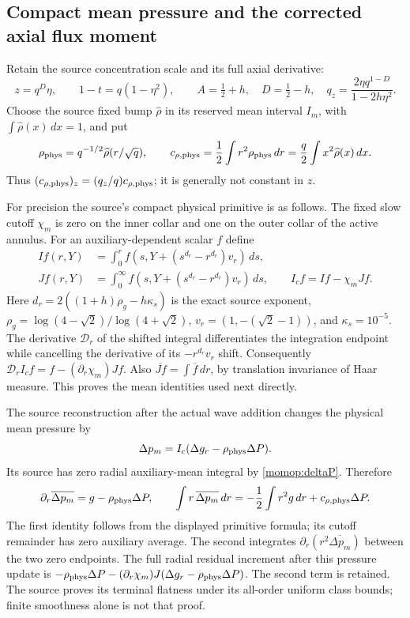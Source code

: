\documentclass[11pt]{article}
\begin{document}
\subsection{Compact mean pressure and the corrected axial flux moment}

Retain the source concentration scale and its full axial derivative:
\[
 z=q^D\eta,\qquad 1-t=q(1-\eta^2),\qquad
 A=\tfrac12+h,\quad D=\tfrac12-h,\quad
 q_z=\frac{2\eta q^{1-D}}{1-2h\eta^2}.
\]
Choose the source fixed bump $\widehat\rho$ in its reserved mean
interval $I_m$, with $\int\widehat\rho(x)\,dx=1$, and put
\[
 \rho_{\rm phys}=q^{-1/2}\widehat\rho(r/\sqrt q),\qquad
 c_{\rho,\rm phys}=\frac12\int r^2\rho_{\rm phys}\,dr
             =\frac q2\int x^2\widehat\rho(x)\,dx .
\]
Thus $(c_{\rho,\rm phys})_z=(q_z/q)c_{\rho,\rm phys}$;
it is generally not constant in $z$.

For precision the source's compact physical primitive is as follows.
The fixed slow cutoff $\chi_m$ is zero on the inner collar and one
on the outer collar of the active annulus. For an auxiliary-dependent
scalar $f$ define
\[
 \begin{split}
 I f(r,Y)&=\int_0^r
 f(s,Y+(s^{d_r}-r^{d_r})v_r)\,ds,\\
 J f(r,Y)&=\int_0^\infty
 f(s,Y+(s^{d_r}-r^{d_r})v_r)\,ds,\qquad
 I_cf=If-\chi_mJf.
 \end{split}
\]
Here $d_r=2((1+h)\rho_g-h\kappa_s)$ is the exact source exponent,
$\rho_g=\log(4-\sqrt2)/\log(4+\sqrt2)$,
$v_r=(1,-(\sqrt2-1))$, and $\kappa_s=10^{-5}$.
The derivative $\mathcal D_r$ of the shifted integral differentiates
the integration endpoint while cancelling the derivative of its
$-r^{d_r}v_r$ shift. Consequently
$\mathcal D_rI_cf=f-(\partial_r\chi_m)Jf$.
Also $\overline{Jf}=\int\overline f\,dr$, by translation invariance
of Haar measure. This proves the mean identities used next directly.

The source reconstruction after the actual wave addition changes the
physical mean pressure by
\[
 \Delta p_m=I_c(\Delta g_r-\rho_{\rm phys}\Delta P).
\]
Its source has zero radial auxiliary-mean integral by
\eqref{momop:deltaP}. Therefore
\begin{equation}\label{momop:pressureidentity}
 \partial_r\overline{\Delta p_m}
     =g-\rho_{\rm phys}\Delta P,\qquad
 \int r\,\overline{\Delta p_m}\,dr
     =-\frac12\int r^2g\,dr+c_{\rho,\rm phys}\Delta P .
\end{equation}
The first identity follows from the displayed primitive formula;
its cutoff remainder has zero auxiliary average. The second integrates
$\partial_r(r^2\overline{\Delta p_m})$ between the two zero endpoints.
The full radial residual increment after this pressure update is
$-\rho_{\rm phys}\Delta P-
(\partial_r\chi_m)J(\Delta g_r-\rho_{\rm phys}\Delta P)$.
The second term is retained. The source proves its terminal flatness
under its all-order uniform class bounds; finite smoothness alone is
not that proof.
\end{document}
